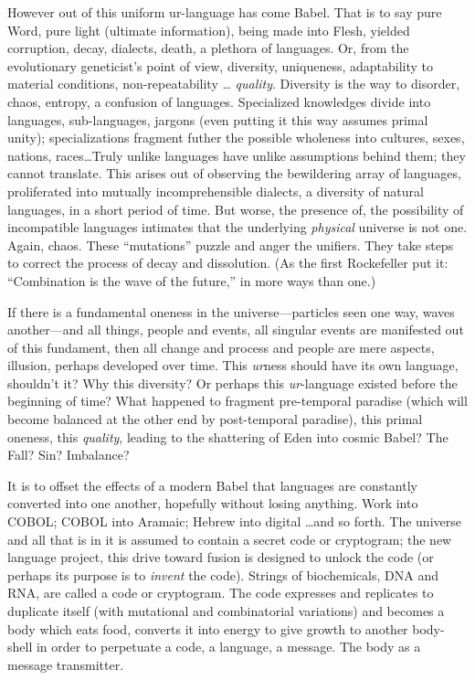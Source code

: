 However out of this uniform ur-language has come Babel. That is to say pure Word,
pure light (ultimate information), being made into Flesh, yielded corruption, decay,
dialects, death, a plethora of languages. Or, from the evolutionary geneticist's point of
view, diversity, uniqueness, adaptability to material conditions, non-repeatability \ldots
\emph{quality}. Diversity is the way to disorder, chaos, entropy, 
a confusion of languages. Specialized knowledges divide into languages,
sub-languages, jargons (even putting it this way assumes primal unity);
specializations fragment futher the possible wholeness into cultures, sexes, nations,
races\ldots Truly unlike languages have unlike assumptions behind them;
they cannot translate. This arises out of observing the bewildering array of languages, proliferated
into mutually incomprehensible dialects, a diversity of natural languages,
in a short period of time. But worse, the presence of,
the possibility of incompatible languages intimates that the underlying 
\emph{physical} universe is not one. Again, chaos. These \enquote{mutations} 
puzzle and anger the unifiers. They take steps to correct the process of decay and
dissolution. (As the first Rockefeller put it:
\enquote{Combination is the wave of the future,} in more ways than one.)

If there is a fundamental oneness in the
universe---particles seen one way, waves
another---and all things, people and events,
all singular events are manifested out of this
fundament, then all change and process and
people are mere aspects, illusion, perhaps
developed over time. This \emph{ur}ness should
have its own language, shouldn't it? Why
this diversity? Or perhaps this \emph{ur}-language
existed before the beginning of time? What
happened to fragment pre-temporal paradise
(which will become balanced at the other
end by post-temporal paradise), this primal
oneness, this \emph{quality}, leading to the 
shattering of Eden into cosmic Babel? The Fall?
Sin? Imbalance?

It is to offset the effects of a modern Babel that languages are constantly converted into
one another, hopefully without losing anything. Work into COBOL; COBOL into Aramaic;
Hebrew into digital \ldots and so forth.
The universe and all that is in it is assumed to contain a secret code or cryptogram; the
new language project, this drive toward fusion is designed to unlock the code (or
perhaps its purpose is to \emph{invent} the code).
Strings of biochemicals, DNA and RNA, are
called a code or cryptogram. The code expresses and replicates to duplicate itself
(with mutational and combinatorial variations) and becomes a body which eats food,
converts it into energy to give growth to
another body-shell in order to perpetuate a
code, a language, a message. The body as a
message transmitter.

